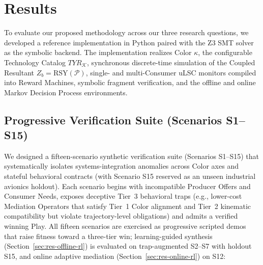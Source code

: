 \section{Results} \label{sec:results}

To evaluate our proposed methodology across our three research questions, we developed a reference implementation in Python paired with the Z3 SMT solver~\cite{deMouraZ32008} as the symbolic backend.  The implementation realizes Color $\kappa$, the configurable Technology Catalog $TYR_{\mathcal{K}}$, synchronous discrete-time simulation of the Coupled Resultant $Z_b = \mathrm{RSY}(\mathcal{P})$, single- and multi-Consumer uLSC monitors compiled into Reward Machines, symbolic fragment verification, and the offline and online Markov Decision Process environments.

\subsection{Progressive Verification Suite (Scenarios S1--S15)} \label{sec:res-catalog}

We designed a fifteen-scenario synthetic verification suite (Scenarios S1--S15) that systematically isolates systems-integration anomalies across Color axes and stateful behavioral contracts (with Scenario S15 reserved as an unseen industrial avionics holdout).  Each scenario begins with incompatible Producer Offers and Consumer Needs, exposes deceptive Tier~3 behavioral traps (e.g., lower-cost Mediation Operators that satisfy Tier~1 Color alignment and Tier~2 kinematic compatibility but violate trajectory-level obligations) and admits a verified winning Play.  All fifteen scenarios are exercised as progressive scripted demos that raise fitness toward a three-tier win; learning-guided synthesis (Section~\ref{sec:res-offline-rl}) is evaluated on trap-augmented S2--S7 with holdout S15, and online adaptive mediation (Section~\ref{sec:res-online-rl}) on S12:

